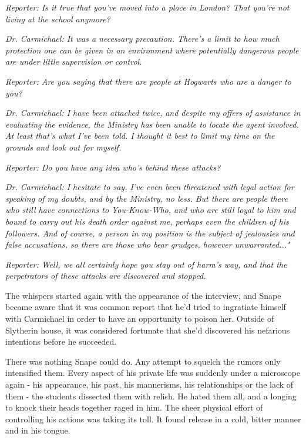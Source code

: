 \documentclass[a4paper,11pt]{article}
\begin{document}
\emph{Reporter: Is it true that you've moved into a place in London? That you're not living at the school anymore?}

\emph{Dr. Carmichael: It was a necessary precaution. There's a limit to how much protection one can be given in an environment where potentially dangerous people are under little supervision or control.}

\emph{Reporter: Are you saying that there are people at Hogwarts who are a danger to you?}

\emph{Dr. Carmichael: I have been attacked twice, and despite my offers of assistance in evaluating the evidence, the Ministry has been unable to locate the agent involved. At least that's what I've been told. I thought it best to limit my time on the grounds and look out for myself.}

\emph{Reporter: Do you have any idea who's behind these attacks?}

\emph{Dr. Carmichael: I hesitate to say. I've even been threatened with legal action for speaking of my doubts, and by the Ministry, no less. But there are people there who still have connections to You-Know-Who, and who are still loyal to him and bound to carry out his death order against me, perhaps even the children of his followers. And of course, a person in my position is the subject of jealousies and false accusations, so there are those who bear grudges, however unwarranted..."}

\emph{Reporter: Well, we all certainly hope you stay out of harm's way, and that the perpetrators of these attacks are discovered and stopped.}

The whispers started again with the appearance of the interview, and Snape became aware that it was common report that he'd tried to ingratiate himself with Carmichael in order to have an opportunity to poison her. Outside of Slytherin house, it was considered fortunate that she'd discovered his nefarious intentions before he succeeded.

There was nothing Snape could do. Any attempt to squelch the rumors only intensified them. Every aspect of his private life was suddenly under a microscope again - his appearance, his past, his mannerisms, his relationships or the lack of them - the students dissected them with relish. He hated them all, and a longing to knock their heads together raged in him. The sheer physical effort of controlling his actions was taking its toll. It found release in a cold, bitter manner and in his tongue.
\end{document}
